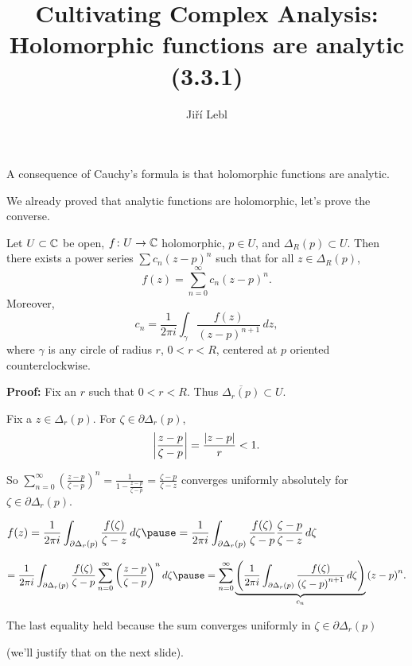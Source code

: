 \documentclass[10pt,aspectratio=169]{beamer}
\author{Ji\v{r}\'i Lebl}
\institute[OSU]{%
Departemento pri Matematiko de Oklahoma {\^S}tata Universitato}
\title{Cultivating Complex Analysis:\\%
Holomorphic functions are analytic (3.3.1)}
\date{}
\begin{document}
\begin{frame}
\titlepage
\end{frame}

\begin{frame}
A consequence of Cauchy's formula is
that holomorphic functions are analytic.

\medskip
\pause

We already proved
that analytic functions are holomorphic, let's prove the converse.

\pause

\begin{theorem} \label{thm:holpower}
Let $U \subset {\mathbb{C}}$ be open, $f \colon U \to {\mathbb{C}}$
holomorphic, $p \in U$, and $\Delta_R(p) \subset U$.
\pause
Then there exists a power series $\sum c_n {(z-p)}^n$
such that for all $z \in \Delta_R(p)$,
\begin{equation*}
f(z) = \sum_{n=0}^\infty c_n {(z-p)}^n .
\end{equation*}
\pause
Moreover,
\begin{equation*}
c_n = 
\frac{1}{2\pi i}
\int_{\gamma}
\frac{f(z)}{{(z-p)}^{n+1}}
\,
dz  ,
\end{equation*}
where $\gamma$ is any circle of radius $r$, $0 < r < R$, centered at
$p$ oriented counterclockwise.
\end{theorem}

\end{frame}

\begin{frame}

\textbf{Proof:}
Fix an $r$ such that $0 < r < R$.
\pause
Thus $\overline{\Delta_r(p)} \subset U$.

\pause
\medskip

Fix a $z \in \Delta_r(p)$.
\pause
For $\zeta \in \partial \Delta_r(p)$, 
\[
\left\lvert {\frac{z-p}{\zeta-p}} \right\rvert =
\frac{\lvert {z-p} \rvert}{r} < 1 .
\]

\pause

So
\quad
$\displaystyle
\sum_{n=0}^\infty
{\left(\frac{z-p}{\zeta-p}\right)}^n
=
\frac{1}{1-\frac{z-p}{\zeta-p}}
=
\frac{\zeta-p}{\zeta-z}
$
\quad
converges uniformly absolutely for $\zeta \in \partial \Delta_r(p)$.

\pause
\medskip

$\displaystyle
f(z)
=
\frac{1}{2\pi i}
\int_{\partial \Delta_r(p)}
\frac{f(\zeta)}{\zeta-z}
\,
d \zeta 
\pause
=
\frac{1}{2\pi i}
\int_{\partial \Delta_r(p)}
\frac{f(\zeta)}{\zeta-p}
\frac{\zeta-p}{\zeta-z}
\,
d \zeta 
$

\medskip
\pause

\hspace*{0.5in}$\displaystyle
=
\frac{1}{2\pi i}
\int_{\partial \Delta_r(p)}
\frac{f(\zeta)}{\zeta-p}
\sum_{n=0}^\infty
{\left(\frac{z-p}{\zeta-p}\right)}^n
\,
d \zeta 
\pause
=
\sum_{n=0}^\infty
\underbrace{
\left(
\frac{1}{2\pi i}
\int_{\partial \Delta_r(p)}
\frac{f(\zeta)}{{(\zeta-p)}^{n+1}}
\,
d \zeta 
\right)
}_{c_n}
{(z-p)}^n .
$

The last equality held because the sum converges uniformly in 
$\zeta \in \partial \Delta_r(p)$

(we'll justify that on the next slide).

\end{frame}
\end{document}
